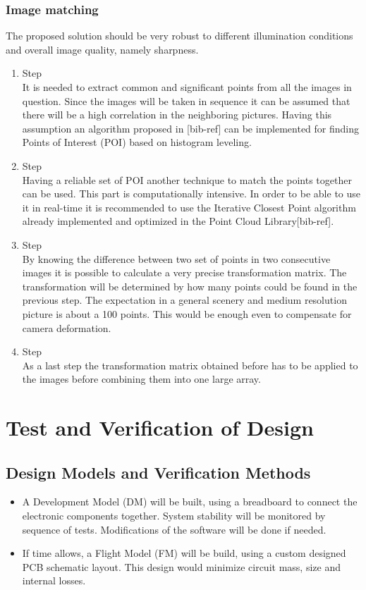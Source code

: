 \documentclass[fontsize=11pt,paper=a4,]{scrartcl}
\begin{document}
\subsubsection*{Image matching}
\label{sec:algorithm}
The proposed solution should be very robust to different illumination conditions and overall image quality, namely sharpness. 
\begin{enumerate}
\item Step\\
It is needed to extract common and significant points from all the images in question. Since the images
will be taken in sequence it can be assumed that there will be a high correlation in the neighboring pictures.
Having this assumption an algorithm proposed in [bib-ref] can be implemented for finding 
Points of Interest (POI) based on histogram leveling. 
\item Step \\
Having a reliable set of POI another technique to match the points together can be used. This part is
computationally intensive. In order to be able to use it in real-time it is recommended to use the Iterative Closest Point
algorithm already implemented and optimized in the Point Cloud Library[bib-ref].
\item Step\\
By knowing the difference between two set of points in two consecutive images it is possible to calculate
a very precise transformation matrix. The transformation will be determined by how many points
could be found in the previous step. The expectation in a general scenery and medium resolution picture
is about a 100 points. This would be enough even to compensate for camera deformation.
\item Step \\
As a last step the transformation matrix obtained before has to be applied to the images before combining them into one large array. 
\end{enumerate}


\FloatBarrier
\section{Test and Verification of Design}
\subsection{Design Models and Verification Methods}
\begin{itemize}
\item A Development Model (DM) will be built, using a breadboard to connect the electronic components together. System stability will be monitored by sequence of tests. Modifications of the software will be done if needed.
\item If time allows, a Flight Model (FM) will be build, using a custom designed PCB schematic layout. This design would minimize circuit mass, size and internal losses.
\end{itemize}
\end{document}
